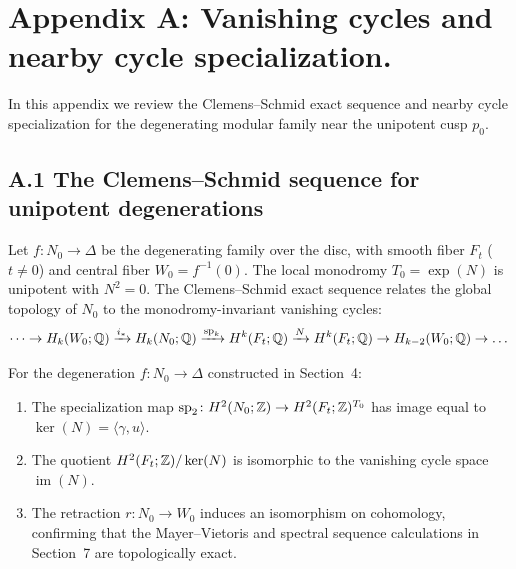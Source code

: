 \section*{Appendix A: Vanishing cycles and nearby cycle specialization.}
\renewcommand{\thesection}{A}

In this appendix we review the Clemens--Schmid exact sequence and nearby cycle specialization for the degenerating modular family near the unipotent cusp $p_0$.

\subsection*{A.1 The Clemens--Schmid sequence for unipotent degenerations}

Let $f \colon N_0 \to \Delta$ be the degenerating family over the disc, with smooth fiber $F_t$ ($t \ne 0$) and central fiber $W_0 = f^{-1}(0)$.
The local monodromy $T_0 = \exp(N)$ is unipotent with $N^2 = 0$.
The Clemens--Schmid exact sequence relates the global topology of $N_0$ to the monodromy-invariant vanishing cycles:
\[
\dots \to H_k(W_0; \mathbb{Q}) \xrightarrow{i_*} H_k(N_0; \mathbb{Q}) \xrightarrow{\mathrm{sp}_k} H^k(F_t; \mathbb{Q}) \xrightarrow{N} H^k(F_t; \mathbb{Q}) \to H_{k-2}(W_0; \mathbb{Q}) \to \dots
\]

\begin{theorem}\label{thm:clemens-schmid}
For the degeneration $f \colon N_0 \to \Delta$ constructed in Section~4:
\begin{enumerate}[label=(\roman*)]
    \item The specialization map $\mathrm{sp}_2 \colon H^2(N_0; \mathbb{Z}) \to H^2(F_t; \mathbb{Z})^{T_0}$ has image equal to $\ker(N) = \langle \gamma, u \rangle$.
    \item The quotient $H^2(F_t; \mathbb{Z}) / \ker(N)$ is isomorphic to the vanishing cycle space $\operatorname{im}(N)$.
    \item The retraction $r \colon N_0 \to W_0$ induces an isomorphism on cohomology, confirming that the Mayer--Vietoris and spectral sequence calculations in Section~7 are topologically exact.
\end{enumerate}
\end{theorem}
